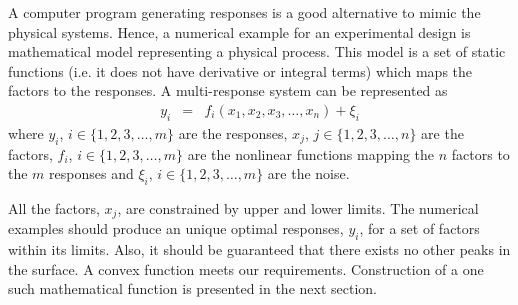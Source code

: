 \documentclass[letterpaper, 12pt]{article}
\begin{document}
A computer program generating responses is a good alternative to mimic the physical systems. Hence, a numerical example for an experimental design is mathematical model representing a physical process. This model is a set of static functions (i.e. it does not have derivative or integral terms) which maps the factors to the responses. A multi-response system can be represented as
\begin{eqnarray}
y_i &=& f_i(x_1, x_2, x_3, \dots, x_n) + \xi_i \label{Eqn:Function}
\end{eqnarray}
\noindent where $y_i$, $i\in \{1,2,3, \dots, m\}$ are the responses, $x_j$, $j\in \{1,2,3, \dots, n\}$ are the factors, $f_i$, $i\in \{1,2,3, \dots, m\}$ are the nonlinear functions mapping the $n$ factors to the $m$ responses and $\xi_i$, $i\in \{1,2,3, \dots, m\}$ are the noise.
\par
All the factors, $x_j$, are constrained by upper and lower limits. The numerical examples should produce an unique optimal responses, $y_i$, for a set of factors within its limits. Also, it should be guaranteed that there exists no other peaks in the surface. A convex function meets our requirements. Construction of a one such mathematical function is presented in the next section.
\end{document}
